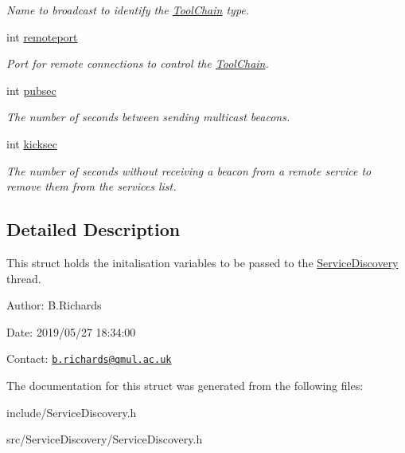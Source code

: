 \begin{DoxyCompactItemize}
\begin{DoxyCompactList}\small\item\em Name to broadcast to identify the \hyperlink{classToolChain}{Tool\-Chain} type. \end{DoxyCompactList}\item 
\hypertarget{structthread__args_a371407c82f7f64e3d9df634e59369565}{int \hyperlink{structthread__args_a371407c82f7f64e3d9df634e59369565}{remoteport}}\label{structthread__args_a371407c82f7f64e3d9df634e59369565}

\begin{DoxyCompactList}\small\item\em Port for remote connections to control the \hyperlink{classToolChain}{Tool\-Chain}. \end{DoxyCompactList}\item 
\hypertarget{structthread__args_aba650f345201e8aece9071377945cf0e}{int \hyperlink{structthread__args_aba650f345201e8aece9071377945cf0e}{pubsec}}\label{structthread__args_aba650f345201e8aece9071377945cf0e}

\begin{DoxyCompactList}\small\item\em The number of seconds between sending multicast beacons. \end{DoxyCompactList}\item 
\hypertarget{structthread__args_a9b75103528b3a6fcc3dfc133cd1b1e8e}{int \hyperlink{structthread__args_a9b75103528b3a6fcc3dfc133cd1b1e8e}{kicksec}}\label{structthread__args_a9b75103528b3a6fcc3dfc133cd1b1e8e}

\begin{DoxyCompactList}\small\item\em The number of seconds without receiving a beacon from a remote service to remove them from the services list. \end{DoxyCompactList}\end{DoxyCompactItemize}


\subsection{Detailed Description}
This struct holds the initalisation variables to be passed to the \hyperlink{classServiceDiscovery}{Service\-Discovery} thread.

\begin{DoxyParagraph}{Author\-:}
B.\-Richards 
\end{DoxyParagraph}
\begin{DoxyParagraph}{Date\-:}
2019/05/27 18\-:34\-:00 
\end{DoxyParagraph}
Contact\-: \href{mailto:b.richards@qmul.ac.uk}{\tt b.\-richards@qmul.\-ac.\-uk} 

The documentation for this struct was generated from the following files\-:\begin{DoxyCompactItemize}
\item 
include/Service\-Discovery.\-h\item 
src/\-Service\-Discovery/Service\-Discovery.\-h\end{DoxyCompactItemize}
